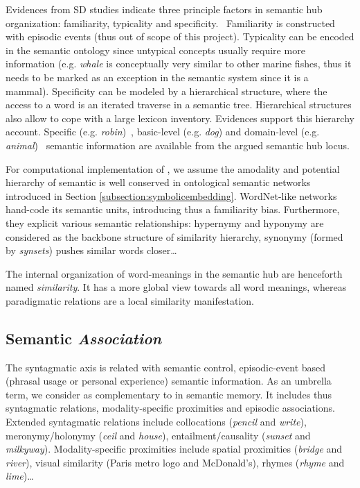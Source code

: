 Evidences from SD studies indicate three principle factors in semantic hub organization: familiarity, typicality and specificity.~\parencite{pattersonWhereYouKnow2007} Familiarity is constructed with episodic events (thus out of scope of this project). Typicality can be encoded in the semantic ontology since untypical concepts usually require more information (e.g. \emph{whale} is conceptually very similar to other marine fishes, thus it needs to be marked as an exception in the semantic system since it is a mammal). Specificity can be modeled by a hierarchical structure, where the access to a word is an iterated traverse in a semantic tree. Hierarchical structures also allow to cope with a large lexicon inventory. Evidences support this hierarchy account. Specific (e.g. \emph{robin})~\parencite{rogersAnteriorTemporalCortex2006}, basic-level (e.g. \emph{dog}) and domain-level (e.g. \emph{animal})~\parencite{pobricCategorySpecificCategoryGeneralSemantic2010} semantic information are available from the argued semantic hub locus. 

For computational implementation of \similarity, we assume the amodality and potential hierarchy of semantic \similarity is well conserved in ontological semantic networks introduced in Section \ref{subsection:symbolicembedding}. WordNet-like networks hand-code its semantic units, introducing thus a familiarity bias. Furthermore, they explicit various semantic relationships: hypernymy and hyponymy are considered as the backbone structure of similarity hierarchy, synonymy (formed by \emph{synsets}) pushes similar words closer\dots

The internal organization of word-meanings in the semantic hub are henceforth named \emph{similarity}. It has a more global view towards all word meanings, whereas paradigmatic relations are a local similarity manifestation. 

\subsection{Semantic \emph{Association}}

The syntagmatic axis is related with semantic control, episodic-event based (phrasal usage or personal experience) semantic information. As an umbrella term, we consider \association as complementary to \similarity in semantic memory. It includes thus syntagmatic relations, modality-specific proximities and episodic associations. Extended syntagmatic relations include collocations (\emph{pencil} and \emph{write}), meronymy\slash holonymy (\emph{ceil} and \emph{house}), entailment\slash causality (\emph{sunset} and \emph{milkyway}). Modality-specific proximities include spatial proximities (\emph{bridge} and \emph{river}), visual similarity (Paris metro logo and McDonald's), rhymes (\emph{rhyme} and \emph{lime})\dots

